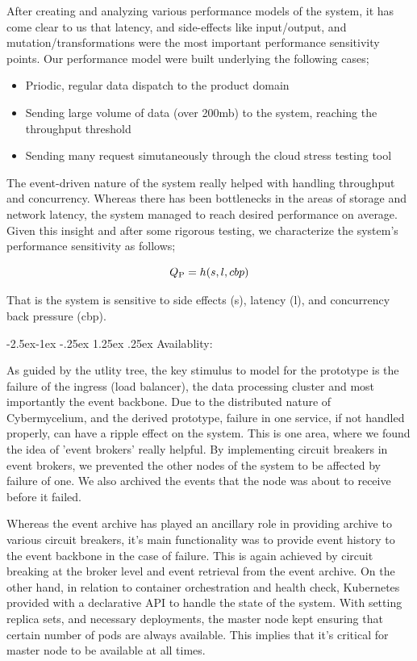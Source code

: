 \documentclass[review]{elsarticle}
\makeatletter
\renewcommand\paragraph{\@startsection{paragraph}{4}{\z@}%
            {-2.5ex\@plus -1ex \@minus -.25ex}%
            {1.25ex \@plus .25ex}%
            {\normalfont\normalsize\itshape}}
\makeatother
\begin{document}
After creating and analyzing various performance models of the system, it has come clear to us that latency, and side-effects like input/output, and mutation/transformations were the most important performance sensitivity points. Our performance model were built underlying the following cases;

\begin{itemize}
    \item Priodic, regular data dispatch to the product domain
    \item Sending large volume of data (over 200mb) to the system, reaching the throughput threshold
    \item Sending many request simutaneously through the cloud stress testing tool
\end{itemize}

The event-driven nature of the system really helped with handling throughput and concurrency. Whereas there has been bottlenecks in the areas of storage and network latency, the system managed to reach desired performance on average. Given this insight and after some rigorous testing, we characterize the system's performance sensitivity as follows;

\begin{equation}
    Q\textsubscript{P} = h(s, l, cbp)
\end{equation}

That is the system is sensitive to side effects (s), latency (l), and concurrency back pressure (cbp).

\paragraph{Availablity:}

As guided by the utlity tree, the key stimulus to model for the prototype is the failure of the ingress (load balancer), the data processing cluster and most importantly the event backbone. Due to the distributed nature of Cybermycelium, and the derived prototype, failure in one service, if not handled properly, can have a ripple effect on the system. This is one area, where we found the idea of 'event brokers' really helpful. By implementing circuit breakers in event brokers, we prevented the other nodes of the system to be affected by failure of one. We also archived the events that the node was about to receive before it failed.

Whereas the event archive has played an ancillary role in providing archive to various circuit breakers, it's main functionality was to provide event history to the event backbone in the case of failure. This is again achieved by circuit breaking at the broker level and event retrieval from the event archive. On the other hand, in relation to container orchestration and health check, Kubernetes provided with a declarative API to handle the state of the system. With setting replica sets, and necessary deployments, the master node kept ensuring that certain number of pods are always available. This implies that it's critical for master node to be available at all times.
\end{document}
